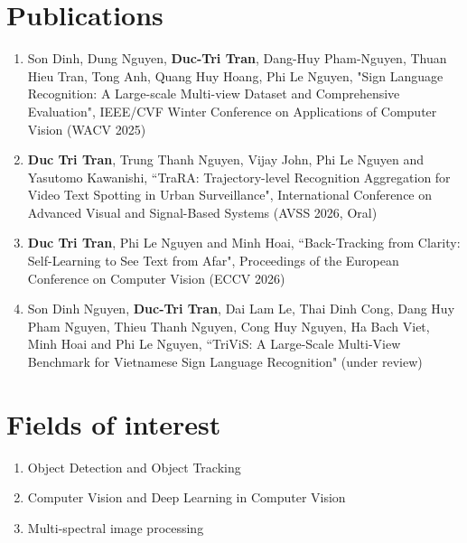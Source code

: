 \documentclass{clean_cv}
\begin{document}
\section{Publications}
\begin{enumerate}
        \item Son Dinh, Dung Nguyen, \textbf{Duc-Tri Tran}, Dang-Huy Pham-Nguyen, Thuan Hieu Tran, Tong Anh, Quang Huy Hoang, Phi Le Nguyen, "Sign Language Recognition: A Large-scale Multi-view Dataset and Comprehensive Evaluation", IEEE/CVF Winter Conference on Applications of Computer Vision (WACV 2025)
        \item \textbf{Duc Tri Tran}, Trung Thanh Nguyen, Vijay John, Phi Le Nguyen and Yasutomo Kawanishi, ``TraRA: Trajectory-level Recognition Aggregation for Video Text Spotting in Urban Surveillance", International Conference on Advanced Visual and Signal-Based Systems (AVSS 2026, Oral)
        \item \textbf{Duc Tri Tran}, Phi Le Nguyen and Minh Hoai, ``Back-Tracking from Clarity: Self-Learning to See Text from Afar", Proceedings of the European Conference on Computer Vision (ECCV 2026)
        \item Son Dinh Nguyen, \textbf{Duc-Tri Tran}, Dai Lam Le, Thai Dinh Cong, Dang Huy Pham Nguyen, Thieu Thanh Nguyen, Cong Huy Nguyen, Ha Bach Viet, Minh Hoai and Phi Le Nguyen, ``TriViS: A Large-Scale Multi-View Benchmark for Vietnamese Sign Language Recognition" (under review) 
\end{enumerate}

\section{Fields of interest}
\begin{enumerate}
    \item Object Detection and Object Tracking
    \item Computer Vision and Deep Learning in Computer Vision
    \item Multi-spectral image processing

\end{enumerate}
\end{document}
